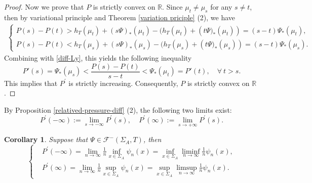 \documentclass[reqno,11pt,graphicx,]{amsart}
\numberwithin{equation}{section}
\theoremstyle{plain}
\newcommand{\R}{{\mathbb R}}
\newcommand{\3}{\mathbf{3}}
\newcommand{\mw}{x}
\newtheorem{corollary}[theorem]{Corollary}
\begin{document}
\begin{proof}
		Now we prove that $P$ is strictly convex on ${\mathbb{R}}$. Since $\mu_{t}\neq\mu_{s}$ for any $s\neq t$, then by variational principle and Theorem \ref{variation priciple} (2), we have 
		\begin{align*}
			\begin{cases}
				P(s)-P(t)> h_T(\mu_t)+(s\Psi)_*(\mu_t)-(h_{T}(\mu_t)+\left(t\Psi)_*(\mu_t)\right)=(s-t)\Psi_*(\mu_t),\\
				P(s)-P(t)< h_T(\mu_s)+(s\Psi)_*(\mu_s)-(h_{T}(\mu_s)+\left(t\Psi)_*(\mu_s)\right)=(s-t)\Psi_*(\mu_s).
			\end{cases}
		\end{align*}
		Combining with \eqref{diff-Ly}, this yields the following inequality 
		\begin{equation*}
			P'(s)=\Psi_*(\mu_s)<\frac{P(s)-P(t)}{s-t}<\Psi_*(\mu_t)=P'(t),\quad\forall\ t>s.
		\end{equation*}
		This implies that $P^{\prime }$ is strictly increasing. Consequently, $P$ is strictly convex on ${\mathbb{R}}$. 
	\end{proof}
	By Proposition \ref{relatived-pressure-diff} (2), the following two limits exist: 
	\begin{equation*}\label{lya-infty}
		P^{\prime }(-\infty):=\lim\limits_{s\to-\infty}P^{\prime }(s),\ \ \ \ \
		P^{\prime }(\infty):=\lim\limits_{s\to+\infty}P^{\prime }(s).
	\end{equation*}
	\begin{corollary}\label{psi-pressure}
		Suppose that $\Psi\in\mathcal{F}^-(\Sigma_{A},T)$, then
		\begin{equation}\label{pre-1}
			\left\{ \begin{aligned}
				&	P^{\prime }(-\infty)=\lim_{n\to\infty}\frac{1}{n}\inf_{\mw\in\Sigma_A}\psi_{n}(\mw)=\inf_{\mw\in \Sigma_A}\liminf_{n\to\infty}\frac{1}{n}\psi_{n}(\mw),\\
				&P^{\prime }(\infty)=\lim_{n\to\infty}\frac{1}{n}\sup_{\mw\in\Sigma_A}\psi_{n}(\mw)=\sup_{\mw\in \Sigma_A}\limsup_{n\to\infty}\frac{1}{n}\psi_{n}(\mw). \end{aligned}\right.
		\end{equation}
	\end{corollary}
	
\end{document}
